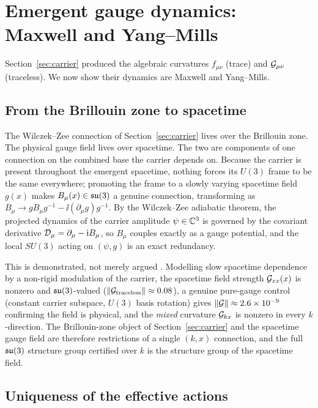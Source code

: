 \section{Emergent gauge dynamics: Maxwell and Yang--Mills}
\label{sec:gauge}

Section~\ref{sec:carrier} produced the algebraic curvatures $f_{\mu\nu}$ (trace) and
$\mathcal{G}_{\mu\nu}$ (traceless). We now show their dynamics are Maxwell and Yang--Mills.

\subsection{From the Brillouin zone to spacetime}
\label{subsec:bridge}

The Wilczek--Zee connection of Section~\ref{sec:carrier} lives over the Brillouin zone. The
physical gauge field lives over spacetime. The two are components of one connection on the
combined base the carrier depends on. Because the carrier is present throughout the emergent
spacetime, nothing forces its $U(3)$ frame to be the same everywhere; promoting the frame to a
slowly varying spacetime field $g(x)$ makes $B_\mu(x)\in\mathfrak{su}(3)$ a genuine connection,
transforming as $B_\mu\to gB_\mu g^{-1}-\ii(\partial_\mu g)g^{-1}$. By the Wilczek--Zee
adiabatic theorem, the projected dynamics of the carrier amplitude $\psi\in\mathbb{C}^3$ is governed by
the covariant derivative $\mathcal{D}_\mu=\partial_\mu-\mathrm{i} B_\mu$, so $B_\mu$ couples exactly as a gauge
potential, and the local $SU(3)$ acting on $(\psi,g)$ is an exact redundancy.

This is demonstrated, not merely argued \citep{repo}. Modelling slow spacetime dependence by a
non-rigid modulation of the carrier, the spacetime field strength $\mathcal{G}_{xx}(x)$ is nonzero and
$\mathfrak{su}(3)$-valued ($\|\mathcal{G}_{\text{traceless}}\|\approx 0.08$), a genuine pure-gauge control
(constant carrier subspace, $U(3)$ basis rotation) gives $\|\mathcal{G}\|\approx 2.6\times10^{-9}$
confirming the field is physical, and the \emph{mixed} curvature $\mathcal{G}_{kx}$ is nonzero in every
$k$-direction. The Brillouin-zone object of Section~\ref{sec:carrier} and the spacetime gauge
field are therefore restrictions of a single $(k,x)$ connection, and the full $\mathfrak{su}(3)$ structure
group certified over $k$ is the structure group of the spacetime field.

\subsection{Uniqueness of the effective actions}
\label{subsec:uniqueness}


